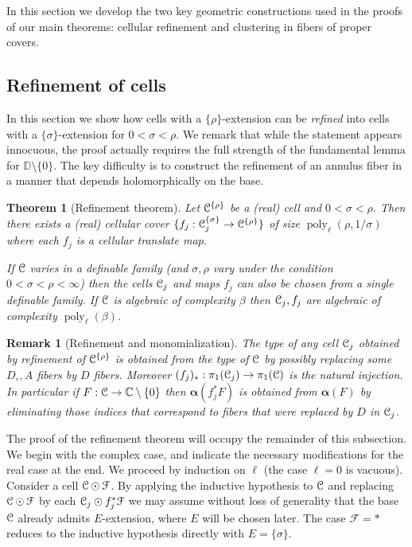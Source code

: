 \documentclass[reqno]{amsart}
\newtheorem{Thm}{Theorem}{\bfseries}{\itshape}
\newtheorem{Rem}[Cor]{Remark}{\scshape}{\rmfamily}
\renewcommand\~[1]{\widetilde{#1}}
\def\D{{\mathbb D}}
\def\poly{\operatorname{poly}} \def\J{\operatorname{J}}
\def\cF{{\mathcal F}} \def\cL{{\mathcal L}} \def\cR{{\mathcal R}}
\def\valpha{{\boldsymbol\alpha}}
\def\he#1{{\{#1\}}}
\def\hrho{{\he\rho}}
\def\hsigma{{\he\sigma}}
\begin{document}
In this section we develop the two key geometric constructions used in
the proofs of our main theorems: cellular refinement and clustering in
fibers of proper covers.

\subsection{Refinement of cells}

In this section we show how cells with a $\hrho$-extension can be
\emph{refined} into cells with a $\hsigma$-extension for
$0<\sigma<\rho$. We remark that while the statement appears innocuous,
the proof actually requires the full strength of the fundamental lemma
for $\D\setminus\{0\}$. The key difficulty is to construct the
refinement of an annulus fiber in a manner that depends
holomorphically on the base.

\begin{Thm}[Refinement theorem]\label{thm:cell-refinement}
  Let $\cC^\hrho$ be a (real) cell and $0<\sigma<\rho$. Then there
  exists a (real) cellular cover $\{f_j:\cC_j^\hsigma\to\cC^\hrho\}$
  of size $\poly_\ell(\rho,1/\sigma)$ where each $f_j$ is a cellular
  translate map.

  If ${\mathcal C}$ varies in a definable family (and $\sigma,\rho$ vary under
  the condition $0<\sigma<\rho<\infty$) then the cells ${\mathcal C}_j$ and
  maps $f_j$ can also be chosen from a single definable family. If
  ${\mathcal C}$ is algebraic of complexity $\beta$ then ${\mathcal C}_j,f_j$ are
  algebraic of complexity $\poly_\ell(\beta)$.
\end{Thm}

\begin{Rem}[Refinement and monomialization]\label{rem:refinement-vs-monom}
  The type of any cell ${\mathcal C}_j$ obtained by refinement of $\cC^\hrho$
  is obtained from the type of ${\mathcal C}$ by possibly replacing some
  $D_\circ,A$ fibers by $D$ fibers. Moreover
  $(f_j)_*:\pi_1({\mathcal C}_j)\to\pi_1({\mathcal C})$ is the natural injection. In
  particular if $F:{\mathcal C}\to{\mathbb C}\setminus\{0\}$ then $\valpha(f_j^*F)$ is
  obtained from $\valpha(F)$ by eliminating those indices that
  correspond to fibers that were replaced by $D$ in ${\mathcal C}_j$.
\end{Rem}

The proof of the refinement theorem will occupy the remainder of this
subsection. We begin with the complex case, and indicate the necessary
modifications for the real case at the end. We proceed by induction on
$\ell$ (the case $\ell=0$ is vacuous). Consider a cell
$\cC\odot\cF$. By applying the inductive hypothesis to ${\mathcal C}$ and
replacing $\cC\odot\cF$ by each $\cC_j\odot f_j^*\cF$ we may assume
without loss of generality that the base ${\mathcal C}$ already admits
$E$-extension, where $E$ will be chosen later. The case $\cF=*$
reduces to the inductive hypothesis directly with $E=\hsigma$.
\end{document}
